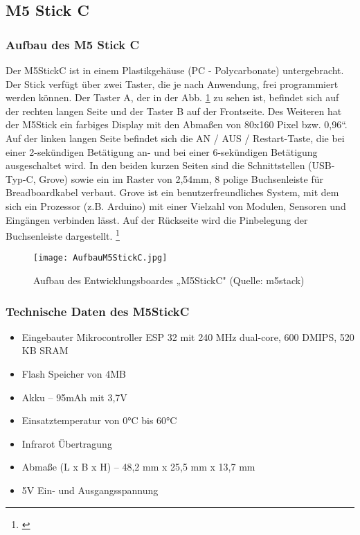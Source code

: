 \documentclass[a4paper,12pt]{article}
\begin{document}
\subsection{M5 Stick C}
\subsubsection{Aufbau des M5 Stick C}
Der M5StickC ist in einem Plastikgehäuse (PC - Polycarbonate) untergebracht. Der Stick verfügt über zwei Taster, die je nach Anwendung, frei programmiert werden können. Der Taster A, der in der Abb. \ref{AufbauM5StickC} zu sehen ist, befindet sich auf der rechten langen Seite und der Taster B auf der Frontseite. Des Weiteren hat der M5Stick ein farbiges Display mit den Abmaßen von 80x160 Pixel bzw. 0,96“. Auf der linken langen Seite befindet sich die AN / AUS / Restart-Taste, die bei einer 2-sekündigen Betätigung an- und bei einer 6-sekündigen Betätigung ausgeschaltet wird. In den beiden kurzen Seiten sind die Schnittstellen (USB-Typ-C, Grove) sowie ein im Raster von 2,54mm, 8 polige Buchsenleiste für Breadboardkabel verbaut. Grove ist ein benutzerfreundliches System, mit dem sich ein Prozessor (z.B. Arduino) mit einer Vielzahl von Modulen, Sensoren und Eingängen verbinden lässt. Auf der Rückseite wird die Pinbelegung der Buchsenleiste dargestellt. \footnote{\cite{M5STACK.}}

\begin{figure}[H]	%
\begin{center}
\texttt{[image: AufbauM5StickC.jpg]}
\caption{Aufbau des Entwicklungsboardes „M5StickC" (Quelle: m5stack)}
\label{AufbauM5StickC}
\end{center}
\end{figure}

\newpage

\subsubsection{Technische Daten des M5StickC}
\begin{itemize}
\item Eingebauter Mikrocontroller ESP 32 mit 240 MHz dual-core, 600 DMIPS, 520 KB SRAM
\item Flash Speicher von 4MB
\item Akku – 95mAh mit 3,7V
\item Einsatztemperatur von 0°C bis 60°C
\item Infrarot Übertragung
\item Abmaße (L x B x H) – 48,2 mm x 25,5 mm x 13,7 mm
\item 5V Ein- und Ausgangsspannung
\end{itemize}
\end{document}
